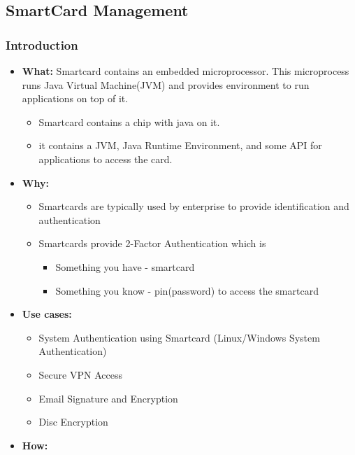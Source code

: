 \documentclass[a4paper]{article}
\begin{document}
\subsection{SmartCard Management}
\subsubsection{Introduction}
    \begin{itemize}
        \item \textbf{What:} Smartcard contains an embedded microprocessor. This microprocess runs Java Virtual Machine(JVM) and 
            provides environment to run applications on top of it. 
            \begin{itemize}
                \item Smartcard contains a chip with java on it. 
                \item it contains a JVM, Java Runtime Environment, and some API for applications to access the card.
            \end{itemize}
        \item \textbf{Why:} 
            \begin{itemize}
                \item Smartcards are typically used by enterprise to provide identification and authentication
                \item Smartcards provide 2-Factor Authentication which is 
                    \begin{itemize}
                        \item Something you have - smartcard
                        \item Something you know - pin(password) to access the smartcard
                    \end{itemize}
            \end{itemize}
        \item \textbf{Use cases:}
            \begin{itemize}
                \item System Authentication using Smartcard (Linux/Windows System Authentication)
                \item Secure VPN Access
                \item Email Signature and Encryption
                \item Disc Encryption
            \end{itemize}
        \item \textbf{How:}
            \begin{itemize}

\end{itemize}
\end{itemize}
\end{document}
